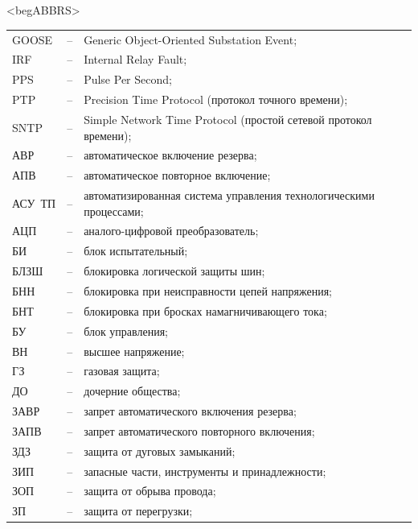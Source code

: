 \color{uniblue}\section*{}
{\color{white}\fontsize{0.1pt}{0.1pt}\selectfont<begABBRS>}
\color{black}
\begin{longtable}{>{\raggedright\arraybackslash}m{2cm}>{\raggedright\arraybackslash}m{0.5cm}>{\raggedright\arraybackslash}m{20cm}}
\endfirsthead\endhead\endfoot\endlastfoot
GOOSE & -- & Generic Object-Oriented Substation Event; \\
IRF & -- & Internal Relay Fault; \\
PPS & -- & Pulse Per Second; \\
PTP & -- & Precision Time Protocol (протокол точного времени); \\
SNTP & -- & Simple Network Time Protocol (простой сетевой протокол времени); \\
АВР & -- & автоматическое включение резерва; \\
АПВ & -- & автоматическое повторное включение; \\
АСУ~ТП & -- & автоматизированная система управления технологическими процессами; \\
АЦП & -- & аналого-цифровой преобразователь; \\
БИ & -- & блок испытательный; \\
БЛЗШ & -- & блокировка логической защиты шин; \\
БНН & -- & блокировка при неисправности цепей напряжения; \\
БНТ & -- & блокировка при бросках намагничивающего тока; \\
БУ & -- & блок управления; \\
ВН & -- & высшее напряжение; \\
ГЗ & -- & газовая защита; \\
ДО & -- & дочерние общества; \\
ЗАВР & -- & запрет автоматического включения резерва; \\
ЗАПВ & -- & запрет автоматического повторного включения; \\
ЗДЗ & -- & защита от дуговых замыканий; \\
ЗИП & -- & запасные части, инструменты и принадлежности; \\
ЗОП & -- & защита от обрыва провода; \\
ЗП & -- & защита от перегрузки; \\

\end{longtable}
